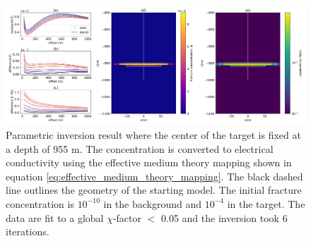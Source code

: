 \begin{figure}
    \begin{center}
    \includegraphics[width=\textwidth]{figures/inversion/dc_parametric_inversion_phi_correctz0_large_r.png}
    \end{center}
\caption{
    Parametric inversion result where the center of the target is fixed at a depth
    of 955 m. The concentration is
    converted to electrical conductivity using the effective medium theory mapping shown in
    equation \ref{eq:effective_medium_theory_mapping}.
    The black dashed line outlines the geometry of the starting model. The initial fracture concentration
    is $10^{-10}$ in the background and $10^{-4}$ in the target.
    The data are fit to a global $\chi$-factor $<$ 0.05 and the inversion took 6 iterations.
}
\label{fig:dc_parametric_inversion_phi_correctz0_large_r}
\end{figure}
